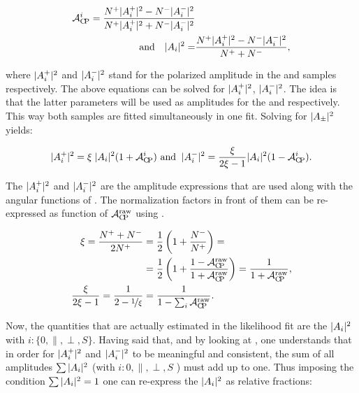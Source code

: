 \begin{align}
  \label{acp_param}
\mathcal{A}_{\rm C\!P}^{i} = \frac{{N^+}|{A}_{i}^+|^2 - {N^-}|{A}_{i}^-|^2}{{N^+}|{A}_{i}^+|^2 + {N^-}|{A}_{i}^-|^2 } & \\
\text{and} \quad |{A}_{i}|^2 = &\frac{ {N^+} |{A}_{i}^+|^2 - {N^-}|{A}_{i}^-|^2}{{N^+} + {N^-}},
\end{align}


\noindent where $|{A}_{i}^+|^2$ and $|{A}_{i}^-|^2$ stand for the polarized amplitude in the \BsbarJpsiKst
and \BsJpsiKst samples respectively. The above equations can be solved for $|{A}_{i}^+|^2$, $|{A}_{i}^-|^2$. The idea
is that the latter parameters will be used as amplitudes for the \BsbarJpsiKst and \BsJpsiKst \pdfs respectively.
This way both samples are fitted simultaneously in one fit. Solving  for $|{A}_{\pm}|^2$ yields:

\begin{equation}
|{A}_{i}^+|^2 = \xi \; |{A}_{i}|^2 (1+\mathcal{A}_{\rm C\!P}^{i}) \,\, \text{and}\;\; |{A}_{i}^-|^2 = \frac{\xi}{2\xi-1} |{A}_{i}|^2 (1-\mathcal{A}_{\rm C\!P}^{i}).
\label{acp_free}
\end{equation}

\noindent The $|{A}_{i}^+|^2$ and $|{A}_{i}^-|^2$ are the amplitude expressions that are used along with the angular functions of .
The normalization factors in front of them can be re-expressed as function of $\mathcal{A}_{\rm C\!P}^{\text{raw}}$ using .

\begin{align}
\xi = \frac{{N^+}+{N^-}}{2{N^+}} &= \frac{1}{2}\left( 1 + \frac{N^{-}_{}}{N^{+}_{}}\right) = \nonumber \\
                                     &= \frac{1}{2}\left( 1 + \frac{1-\mathcal{A}_{\rm C\!P}^{\text{raw}}}{1+\mathcal{A}_{\rm C\!P}^{\text{raw}}}\right) =
                                        \frac{1}{1+\mathcal{A}_{\rm C\!P}^{\text{raw}}},  \\
\frac{\xi}{2\xi-1} = \frac{1}{2-\nicefrac{1}{\xi}} &= \frac{1}{1-\sum_i\mathcal{A}_{\rm C\!P}^{\text{raw}}}.
\label{amp_norms}
\end{align}

\noindent Now, the quantities that are actually estimated in the likelihood fit are the $|{A}_{i}|^2$ with $i:\{0,\parallel,\perp,S\}$.
Having said that, and by looking at , one understands that in order for $|{A}_{i}^+|^2$ and $|{A}_{i}^-|^2$
to be meaningful and consistent, the sum of all amplitudes $\sum|{A}_{i}|^2$ (with $i:{0,\parallel,\perp,S}$ ) must add up to one.
Thus imposing the condition $\sum|{A}_{i}|^2 = 1$ one can re-express the $|{A}_{i}|^2$ as relative fractions:


